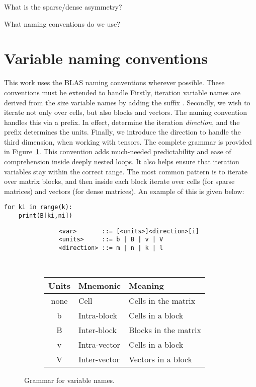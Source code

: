 What is the sparse/dense asymmetry?

What naming conventions do we use?



\section{Variable naming conventions}


This work uses the BLAS naming conventions wherever possible. These conventions must be extended to handle 
Firstly, iteration variable names are derived from the size variable names by adding the suffix . Secondly, we wish to iterate not only over cells, but also blocks and vectors. The naming convention handles this via a prefix. In effect,  determine the iteration \emph{direction}, and the prefix determines the units. Finally, we introduce the direction  to handle the third dimension, when working with tensors. The complete grammar is provided in Figure~\ref{fig:grammar}. This convention adds much-needed predictability and ease of comprehension inside deeply nested loops. It also helps ensure that iteration variables stay within the correct range. The most common pattern is to iterate over matrix blocks, and then inside each block iterate over cells (for sparse matrices) and vectors (for dense matrices). An example of this is given below:

\begin{verbatim}
for ki in range(k):
	print(B[ki,ni])
\end{verbatim}

\begin{figure}[tbh]
  \centering
  \begin{subfigure}[l]{0.48\textwidth}
      \begin{verbatim}
    <var>       ::= [<units>]<direction>[i]
    <units>     ::= b | B | v | V
    <direction> ::= m | n | k | l
  \end{verbatim}
  \end{subfigure}
  ~~~~
  \begin{subfigure}[r]{0.45\textwidth}
    \centering
    \begin{tabular}{cll}
		\toprule
		Units    & Mnemonic & Meaning \\
		\midrule

		none  & Cell          & Cells in the matrix      \\
		b     & Intra-block   & Cells in a block         \\
		B     & Inter-block   & Blocks in the matrix     \\
		v     & Intra-vector  & Cells in a block         \\
		V     & Inter-vector  & Vectors in a block       \\
		\bottomrule
	\end{tabular}
  \end{subfigure}
  \caption{Grammar for variable names.}
  \label{fig:grammar}
\end{figure}


